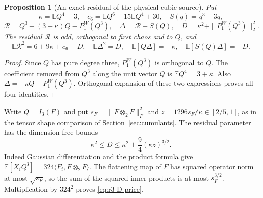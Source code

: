 \documentclass[11pt]{article}
\newcommand{\E}{\mathbb E}
\newtheorem{proposition}[theorem]{Proposition}
\begin{document}
\begin{proposition}[An exact residual of the physical cubic source]
\label{prop:physical-r3-source}
Put
\[
 \kappa=\mathbb EQ^4-3,\quad c_6=\mathbb EQ^6-15\mathbb EQ^4+30,
 \quad S(q)=q^3-3q,
\]
\[
 \mathcal R=Q^3-(3+\kappa)Q-P_1^W(Q^3),\quad
 \Delta=\mathcal R-S(Q),\quad
 D=\kappa^2+\|P_1^W(Q^3)\|_2^2.
\]
The residual $\mathcal R$ is odd, orthogonal to first chaos and to $Q$, and
\begin{equation}\label{eq:physical-r3-identities}
 \mathbb E\mathcal R^2=6+9\kappa+c_6-D,\quad
 \mathbb E\Delta^2=D,\quad
 \mathbb E[Q\Delta]=-\kappa,\quad
 \mathbb E[S(Q)\Delta]=-D.
\end{equation}
\end{proposition}
\begin{proof}
Since $Q$ has pure degree three, $P_1^W(Q^3)$ is orthogonal to $Q$.
The coefficient removed from $Q^3$ along the unit vector $Q$ is
$\mathbb EQ^4=3+\kappa$.  Also
$\Delta=-\kappa Q-P_1^W(Q^3)$.  Orthogonal expansion of these two
expressions proves all four identities.
\end{proof}

Write $Q=I_3(F)$ and put $s_F=\|F\otimes_2F\|_F^2$ and
$z=1296s_F/\kappa\in[2/5,1]$, as in the tensor shape comparison
of Section~\ref{sec:cumulants}.
The residual parameter has the dimension-free bounds
\begin{equation}\label{eq:r3-D-price}
 \kappa^2\le D\le\kappa^2+\frac94(\kappa z)^{3/2}.
\end{equation}
Indeed Gaussian differentiation and the product formula give
$\E[X_iQ^3]=324\langle F_i,F\otimes_2F\rangle$.
The flattening map of $F$ has squared operator norm at most $\sqrt{s_F}$,
so the sum of the squared inner products is at most $s_F^{3/2}$.
Multiplication by $324^2$ proves \eqref{eq:r3-D-price}.
\end{document}
